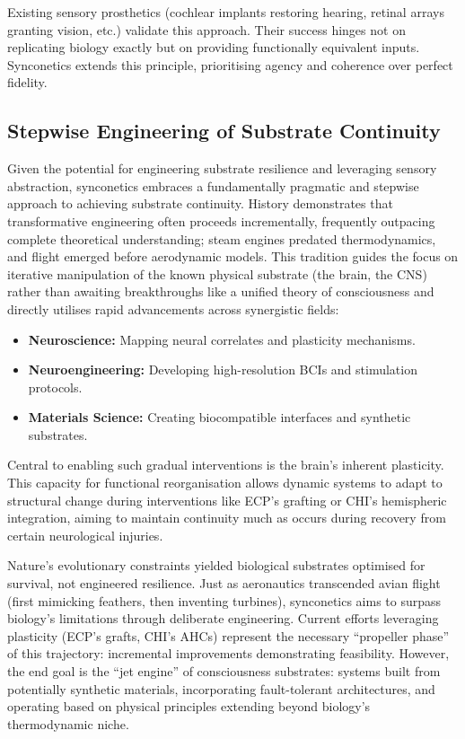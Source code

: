 \documentclass[10pt]{article}
\begin{document}
\begin{sloppypar}
  Existing sensory prosthetics (cochlear implants restoring hearing, retinal arrays granting vision, etc.) validate this approach. Their success hinges not on replicating biology exactly but on providing functionally equivalent inputs. Synconetics extends this principle, prioritising agency and coherence over perfect fidelity.

  \subsection{Stepwise Engineering of Substrate Continuity}
  \label{sec:pragmatic-path-forward}

  Given the potential for engineering substrate resilience and leveraging sensory abstraction, synconetics embraces a fundamentally pragmatic and stepwise approach to achieving substrate continuity. History demonstrates that transformative engineering often proceeds incrementally, frequently outpacing complete theoretical understanding; steam engines predated thermodynamics, and flight emerged before aerodynamic models. This tradition guides the focus on iterative manipulation of the known physical substrate (the brain, the CNS) rather than awaiting breakthroughs like a unified theory of consciousness and directly utilises rapid advancements across synergistic fields:

  \begin{itemize}
    \item \textbf{Neuroscience:} Mapping neural correlates and plasticity mechanisms.
    \item \textbf{Neuroengineering:} Developing high-resolution BCIs and stimulation protocols.
    \item \textbf{Materials Science:} Creating biocompatible interfaces and synthetic substrates.
  \end{itemize}

  Central to enabling such gradual interventions is the brain’s inherent plasticity. This capacity for functional reorganisation allows dynamic systems to adapt to structural change during interventions like ECP’s grafting or CHI’s hemispheric integration, aiming to maintain continuity much as occurs during recovery from certain neurological injuries.

  Nature’s evolutionary constraints yielded biological substrates optimised for survival, not engineered resilience. Just as aeronautics transcended avian flight (first mimicking feathers, then inventing turbines), synconetics aims to surpass biology’s limitations through deliberate engineering. Current efforts leveraging plasticity (ECP’s grafts, CHI’s AHCs) represent the necessary “propeller phase” of this trajectory: incremental improvements demonstrating feasibility. However, the end goal is the “jet engine” of consciousness substrates: systems built from potentially synthetic materials, incorporating fault-tolerant architectures, and operating based on physical principles extending beyond biology’s thermodynamic niche.


\end{sloppypar}
\end{document}

